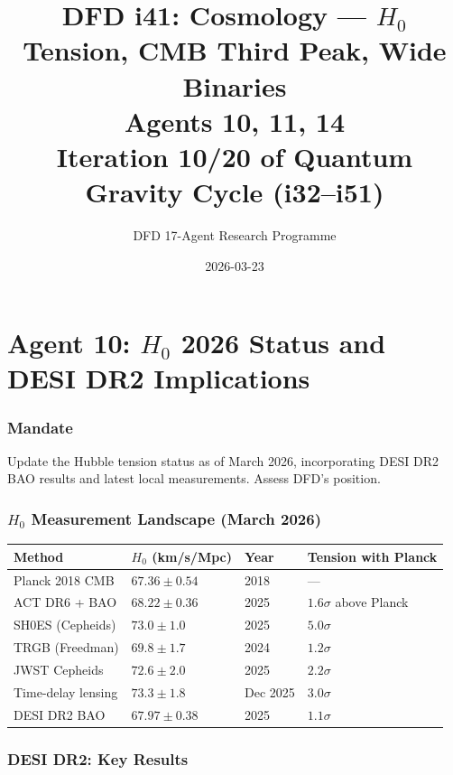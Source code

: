 \documentclass[11pt,a4paper]{article}
\title{DFD i41: Cosmology --- $H_0$ Tension, CMB Third Peak, Wide Binaries\\[6pt]
\large Agents 10, 11, 14\\[6pt]
\normalsize Iteration 10/20 of Quantum Gravity Cycle (i32--i51)}
\author{DFD 17-Agent Research Programme}
\date{2026-03-23}
\begin{document}
\maketitle
\tableofcontents
\newpage

\part{Agent 10: $H_0$ 2026 Status and DESI DR2 Implications}
\label{part:agent10}

\section{Mandate}

Update the Hubble tension status as of March 2026, incorporating DESI DR2 BAO results and latest local measurements. Assess DFD's position.

\section{$H_0$ Measurement Landscape (March 2026)}

\begin{center}
\begin{longtable}{p{4cm}lll}
\toprule
\textbf{Method} & \textbf{$H_0$ (km/s/Mpc)} & \textbf{Year} & \textbf{Tension with Planck} \\
\midrule
\endhead
Planck 2018 CMB & $67.36 \pm 0.54$ & 2018 & --- \\
\midrule
ACT DR6 + BAO & $68.22 \pm 0.36$ & 2025 & $1.6\sigma$ above Planck \\
\midrule
SH0ES (Cepheids) & $73.0 \pm 1.0$ & 2025 & $5.0\sigma$ \\
\midrule
TRGB (Freedman) & $69.8 \pm 1.7$ & 2024 & $1.2\sigma$ \\
\midrule
JWST Cepheids & $72.6 \pm 2.0$ & 2025 & $2.2\sigma$ \\
\midrule
Time-delay lensing & $73.3 \pm 1.8$ & Dec 2025 & $3.0\sigma$ \\
\midrule
DESI DR2 BAO & $67.97 \pm 0.38$ & 2025 & $1.1\sigma$ \\
\bottomrule
\end{longtable}
\end{center}

\section{DESI DR2: Key Results}
\end{document}
